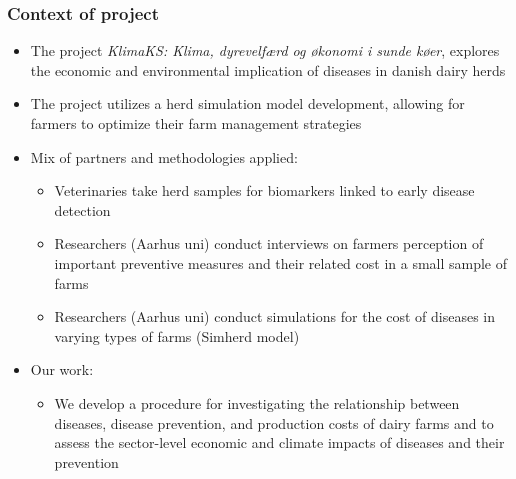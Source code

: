 \documentclass[t,24pt,aspectratio=169]{beamer}
\begin{document}
\begin{frame}[hvid]

\frametitle{\vspace{-3ex}Context of project}
\begin{itemize}
    \item The project \textit{KlimaKS: Klima, dyrevelfærd og økonomi i sunde køer}, explores the economic and environmental implication of diseases in danish dairy herds
    \item The project utilizes a herd simulation model development, allowing for farmers to optimize their farm management strategies
    \item Mix of partners and methodologies applied:
    \begin{itemize}
        \item Veterinaries take herd samples for biomarkers linked to early disease detection 
        \item Researchers (Aarhus uni) conduct interviews on farmers perception of important preventive measures and their related cost in a small sample of farms
        \item Researchers (Aarhus uni) conduct simulations for the cost of diseases in varying types of farms (Simherd model)
    \end{itemize}
    \item Our work:
    \begin{itemize}
        \item We develop a procedure for investigating the relationship between diseases, disease prevention, and production costs of dairy farms
        and to assess the sector-level economic and climate impacts
        of diseases and their prevention
    \end{itemize}
\end{itemize}
\end{frame}
\end{document}

